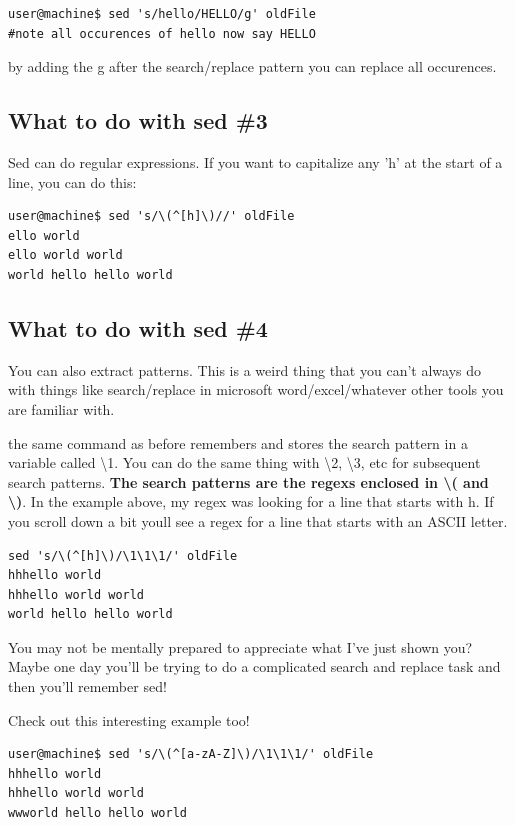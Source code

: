 \documentclass[10pt]{article}
\begin{document}
\begin{lstlisting}[style=term]
user@machine$ sed 's/hello/HELLO/g' oldFile
#note all occurences of hello now say HELLO
\end{lstlisting}

by adding the g after the search/replace pattern you can replace all occurences.

\subsection{What to do with sed \#3}
Sed can do regular expressions. If you want to capitalize any 'h' at the start of a line, you can do this:

\begin{lstlisting}[style=term]
user@machine$ sed 's/\(^[h]\)//' oldFile
ello world
ello world world
world hello hello world
\end{lstlisting}

\subsection{What to do with sed \#4}
You can also extract patterns. This is a weird thing that you can't always do with things like search/replace in microsoft word/excel/whatever other tools you are familiar with.

the same command as before remembers and stores the search pattern in a variable called \textbackslash1. You can do the same thing with \textbackslash2, \textbackslash3, etc for subsequent search patterns. \textbf{The search patterns are the regexs enclosed in \textbackslash( and \textbackslash)}. In the example above, my regex was looking for a line that starts with h. If you scroll down a bit youll see a regex for a line that starts with an ASCII letter.

\begin{lstlisting}[style=term]
sed 's/\(^[h]\)/\1\1\1/' oldFile
hhhello world
hhhello world world
world hello hello world
\end{lstlisting}

You may not be mentally prepared to appreciate what I've just shown you? Maybe one day you'll be trying to do a complicated search and replace task and then you'll remember sed!

Check out this interesting example too!

\begin{lstlisting}[style=term]
user@machine$ sed 's/\(^[a-zA-Z]\)/\1\1\1/' oldFile
hhhello world
hhhello world world
wwworld hello hello world
\end{lstlisting}
\end{document}
